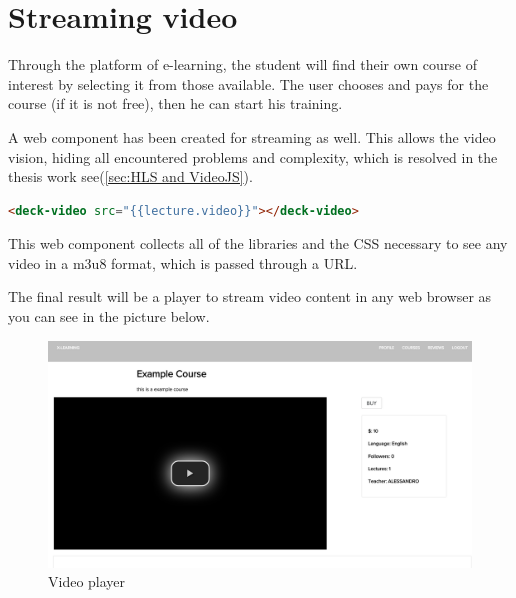 \section{Streaming video}
\label{sec:attend_the_course}

Through the platform of e-learning, the student will find their own course of interest by selecting it from those available.
The user chooses and pays for the course (if it is not free), then he can start his training.

A web component has been created for streaming as well. This allows the video vision, hiding all encountered problems and complexity, which is resolved in the thesis work see(\ref{sec:HLS and VideoJS}).

\begin{lstlisting}[language=html]
  <deck-video src="{{lecture.video}}"></deck-video>
\end{lstlisting}
This web component collects all of the libraries and the CSS necessary to see any video in a m3u8 format, which is passed through a URL.

The final result will be a player to stream video content in any web browser as you can see in the picture below.

\begin{figure}[htb]
 \centering
 \includegraphics[width=1.0\linewidth]{images/chapter5/deck_video.png}\hfill
 \caption[Video player]{Video player}
 \label{fig:fourV}
\end{figure}
